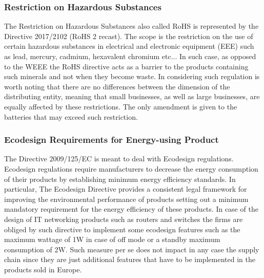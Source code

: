 \begin{doublespace}
\subsubsection{Restriction on Hazardous Substances}
  The Restriction on Hazardous Substances also called RoHS is represented by the Directive 2017/2102 (RoHS 2 recast). The scope is the restriction on the use of certain hazardous substances in electrical and electronic equipment (EEE) such as lead, mercury, cadmium, hexavalent chromium etc... In such case, as opposed to the WEEE the RoHS directive acts as a barrier to the products containing such minerals and not when they become waste. In considering such regulation is worth noting that there are no differences between the dimension of the distributing entity, meaning that small businesses, as well as large businesses, are equally affected by these restrictions. The only amendment is given to the batteries that may exceed such restriction.

\subsubsection{Ecodesign Requirements for Energy-using Product}
  The Directive 2009/125/EC is meant to deal with Ecodesign regulations. Ecodesign regulations require manufacturers to decrease the energy consumption of their products by establishing minimum energy efficiency standards. In particular, The Ecodesign Directive provides a consistent legal framework for improving the environmental performance of products setting out a minimum mandatory requirement for the energy efficiency of these products. In case of the design of IT networking products such as routers and switches the firms are obliged by such directive to implement some ecodesign features such as the maximum wattage of 1W in case of off mode or a standby maximum consumption of 2W. Such measure per se does not impact in any case the supply chain since they are just additional features that have to be implemented in the products sold in Europe.

\pagebreak 


\end{doublespace}
